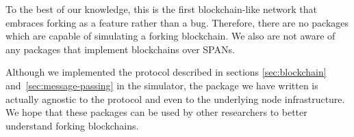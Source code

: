 To the best of our knowledge,
this is the first blockchain-like network
that embraces forking as a feature rather than a bug.
Therefore,
there are no packages which are capable of simulating a forking blockchain.
We also are not aware of any packages that implement blockchains over SPANs.

Although we implemented the protocol described in sections
\ref{sec:blockchain} and~\ref{sec:message-passing}
in the simulator,
the package we have written is actually agnostic to the protocol
and even to the underlying node infrastructure.
We hope that these packages can be used by other researchers
to better understand forking blockchains.
